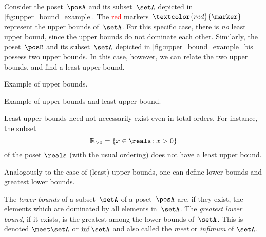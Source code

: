 \begin{example}
Consider the poset~$\posA$ and its subset~$\setA$ depicted in \cref{fig:upper_bound_example}.
The \textcolor{red}{red} markers~$\textcolor{red}{\marker}$ represent the upper bounds of~$\setA$.
For this specific case, there is \emph{no} least upper bound, since the upper bounds do not dominate each other.
Similarly, the poset~$\posB$ and its subset~$\setA$ depicted in \cref{fig:upper_bound_example_bis} possess two upper bounds.
In this case, however, we can relate the two upper bounds, and find a least upper bound.

    \begin{marginfigure}
        \begin{center}
        \end{center}
        \caption{Example of upper bounds. \label{fig:upper_bound_example}}
    \end{marginfigure}

    \begin{marginfigure}
        \begin{center}
        \end{center}
        \caption{Example of upper bounds and least upper bound. \label{fig:upper_bound_example_bis}}
    \end{marginfigure}
\end{example}

\begin{example}
    Least upper bounds need not necessarily exist even in total orders. For instance, the subset
    \begin{equation*}
        \mathbb{R}_{>0} = \{x\in \reals \colon x>0\}
    \end{equation*}
    of the poset $\reals$ (with the usual ordering) does not have a least upper bound.
\end{example}

Analogously to the case of (least) upper bounds, one can define lower bounds and greatest lower bounds.

\begin{definition}
    The \emph{lower bounds} of a subset~$\setA$ of a poset~$\posA$ are, if they exist, the elements which are dominated by all elements in~$\setA$.
    The \emph{greatest lower bound}, if it exists, is the greatest among the lower bounds of~$\setA$. This is denoted $\meet \setA$ or $\inf \setA$ and also called the \emph{meet} or \emph{infimum} of $\setA$.
\end{definition}


